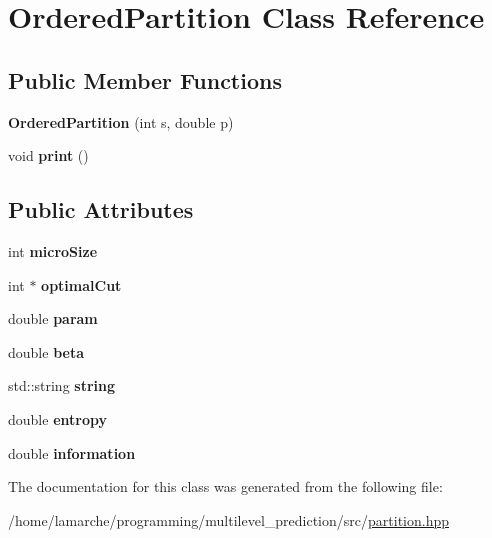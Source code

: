 \hypertarget{class_ordered_partition}{\section{Ordered\-Partition Class Reference}
\label{class_ordered_partition}
}
\subsection*{Public Member Functions}
\begin{DoxyCompactItemize}
\item 
\hypertarget{class_ordered_partition_aabf4e3ee7ddd8279efd1d30f13844dbf}{{\bfseries Ordered\-Partition} (int s, double p)}\label{class_ordered_partition_aabf4e3ee7ddd8279efd1d30f13844dbf}

\item 
\hypertarget{class_ordered_partition_ad62349b410a52274043a328dafb13342}{void {\bfseries print} ()}\label{class_ordered_partition_ad62349b410a52274043a328dafb13342}

\end{DoxyCompactItemize}
\subsection*{Public Attributes}
\begin{DoxyCompactItemize}
\item 
\hypertarget{class_ordered_partition_ac4e60b2ef3d286b496d3274f153ff610}{int {\bfseries micro\-Size}}\label{class_ordered_partition_ac4e60b2ef3d286b496d3274f153ff610}

\item 
\hypertarget{class_ordered_partition_aa87bf05471b9071a94cf53226552f436}{int $\ast$ {\bfseries optimal\-Cut}}\label{class_ordered_partition_aa87bf05471b9071a94cf53226552f436}

\item 
\hypertarget{class_ordered_partition_a8c7fef058b25165c69652e8c78d9bd7e}{double {\bfseries param}}\label{class_ordered_partition_a8c7fef058b25165c69652e8c78d9bd7e}

\item 
\hypertarget{class_ordered_partition_a68c0b17fa5a9fc525af12b9960874ae7}{double {\bfseries beta}}\label{class_ordered_partition_a68c0b17fa5a9fc525af12b9960874ae7}

\item 
\hypertarget{class_ordered_partition_a6508f965f7e829e361c5d73acccce6eb}{std\-::string {\bfseries string}}\label{class_ordered_partition_a6508f965f7e829e361c5d73acccce6eb}

\item 
\hypertarget{class_ordered_partition_acc541302636a852fbb51c876277595a9}{double {\bfseries entropy}}\label{class_ordered_partition_acc541302636a852fbb51c876277595a9}

\item 
\hypertarget{class_ordered_partition_a414f6978e006ba9d647e48ceef9143b8}{double {\bfseries information}}\label{class_ordered_partition_a414f6978e006ba9d647e48ceef9143b8}

\end{DoxyCompactItemize}


The documentation for this class was generated from the following file\-:\begin{DoxyCompactItemize}
\item 
/home/lamarche/programming/multilevel\-\_\-prediction/src/\hyperlink{partition_8hpp}{partition.\-hpp}\end{DoxyCompactItemize}
